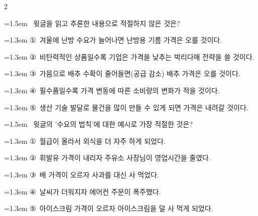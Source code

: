 \documentclass[10pt, a4paper]{article}
\begin{document}
\begin{multicols}{2}
\noindent\begin{minipage}{\columnwidth}
\vspace{2mm}
{\hangindent=1.5em  ~윗글을 읽고 추론한 내용으로 적절하지 않은 것은?\par}

\vspace{0.5mm}
{\hangindent=1.3em  \noindent\hspace{0.3em}①~겨울에 난방 수요가 늘어나면 난방용 기름 가격은 오를 것이다.\par}
{\hangindent=1.3em  \noindent\hspace{0.3em}②~비탄력적인 상품일수록 기업은 가격을 낮추는 박리다매 전략을 쓸 것이다.\par}
{\hangindent=1.3em  \noindent\hspace{0.3em}③~가뭄으로 배추 수확이 줄어들면(공급 감소) 배추 가격은 오를 것이다.\par}
{\hangindent=1.3em  \noindent\hspace{0.3em}④~필수품일수록 가격 변동에 따른 소비량의 변화가 적을 것이다.\par}
{\hangindent=1.3em  \noindent\hspace{0.3em}⑤~생산 기술 발달로 물건을 많이 만들 수 있게 되면 가격은 내려갈 것이다.\par}
\vspace{4mm}
\end{minipage}
\par

\noindent\begin{minipage}{\columnwidth}
\vspace{2mm}
{\hangindent=1.5em  ~윗글의 '수요의 법칙'에 대한 예시로 가장 적절한 것은?\par}

\vspace{0.5mm}
{\hangindent=1.3em  \noindent\hspace{0.3em}①~월급이 올라서 외식을 더 자주 하게 되었다.\par}
{\hangindent=1.3em  \noindent\hspace{0.3em}②~휘발유 가격이 내리자 주유소 사장님이 영업시간을 줄였다.\par}
{\hangindent=1.3em  \noindent\hspace{0.3em}③~배 가격이 오르자 사과를 대신 사 먹었다.\par}
{\hangindent=1.3em  \noindent\hspace{0.3em}④~날씨가 더워지자 에어컨 주문이 폭주했다.\par}
{\hangindent=1.3em  \noindent\hspace{0.3em}⑤~아이스크림 가격이 오르자 아이스크림을 덜 사 먹게 되었다.\par}
\vspace{4mm}
\end{minipage}
\par


\end{multicols}
\end{document}
